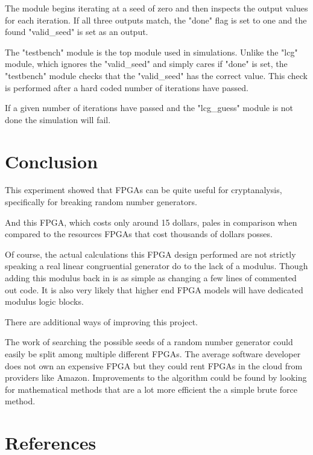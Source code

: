 \documentclass{article}
\begin{document}
    The module begins iterating at a seed of zero and then inspects the output values for each iteration.
    If all three outputs match, the "done" flag is set to one and the found "valid\_seed" is set as an output.

    The "testbench" module is the top module used in simulations.
    Unlike the "lcg" module, which ignores the "valid\_seed" and simply cares if "done" is set,
    the "testbench" module checks that the "valid\_seed" has the correct value.
    This check is performed after a hard coded number of iterations have passed.

    If a given number of iterations have passed and the "lcg\_guess" module is not done
    the simulation will fail.

    \section{Conclusion}

    This experiment showed that FPGAs can be quite useful for
    cryptanalysis, specifically for breaking random number generators.

    And this FPGA, which costs only around 15 dollars, pales in comparison
    when compared to the resources FPGAs that cost thousands of dollars posses.

    Of course, the actual calculations this FPGA design performed are not
    strictly speaking a real linear congruential generator
    do to the lack of a modulus. Though adding this modulus back
    in is as simple as changing a few lines of commented out code.
    It is also very likely that higher end FPGA models will have
    dedicated modulus logic blocks.

    There are additional ways of improving this project.

    The work of searching the possible seeds of a random number generator
    could easily be split among multiple different FPGAs.
    The average software developer does not own an expensive FPGA
    but they could rent FPGAs in the cloud from providers like Amazon.
    Improvements to the algorithm could be found by looking for mathematical
    methods that are a lot more efficient the a simple brute force method.
    
    \break
    \section*{References}
\end{document}
